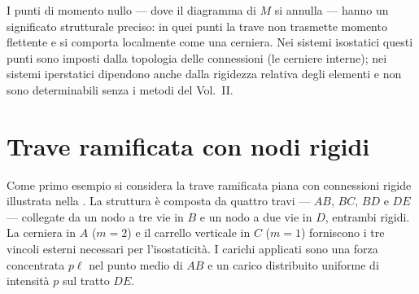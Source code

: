 \begin{oss}
	I punti di momento nullo --- dove il
	diagramma di $M$ si annulla --- hanno
	un significato strutturale preciso:
	in quei punti la trave non trasmette
	momento flettente e si comporta
	localmente come una cerniera. Nei
	sistemi isostatici questi punti sono
	imposti dalla topologia delle connessioni
	(le cerniere interne); nei sistemi
	iperstatici dipendono anche dalla
	rigidezza relativa degli elementi e
	non sono determinabili senza i metodi
	del Vol.~II.
\end{oss}


\section{Trave ramificata con nodi rigidi}
\label{sec:trave_ramificata}

Come primo esempio si considera la trave ramificata
piana con connessioni rigide illustrata nella
. La struttura è
composta da quattro travi --- $AB$, $BC$, $BD$
e $DE$ --- collegate da un nodo a tre vie in $B$
e un nodo a due vie in $D$, entrambi rigidi.
La cerniera in $A$ ($m = 2$) e il carrello
verticale in $C$ ($m = 1$) forniscono i tre
vincoli esterni necessari per l'isostaticità.
I carichi applicati sono una forza concentrata
$p\ell$ nel punto medio di $AB$ e un carico
distribuito uniforme di intensità $p$ sul
tratto $DE$.

